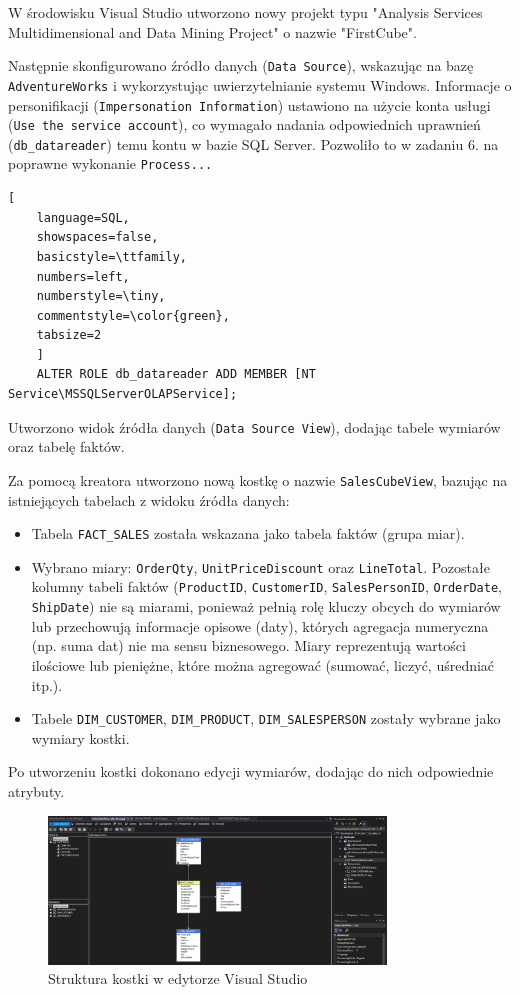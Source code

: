 \documentclass[a4paper,12pt]{article}
\begin{document}
W środowisku Visual Studio utworzono nowy projekt typu "Analysis Services Multidimensional and Data Mining Project" o nazwie "FirstCube".

Następnie skonfigurowano źródło danych (\texttt{Data Source}), wskazując na bazę \texttt{AdventureWorks} i wykorzystując uwierzytelnianie systemu Windows. Informacje o personifikacji (\texttt{Impersonation Information}) ustawiono na użycie konta usługi (\texttt{Use the service account}), co wymagało nadania odpowiednich uprawnień (\texttt{db\_datareader}) temu kontu w bazie SQL Server.
Pozwoliło to w zadaniu 6. na poprawne wykonanie \texttt{Process...}
{\small
    \begin{lstlisting}[
    language=SQL,
    showspaces=false,
    basicstyle=\ttfamily,
    numbers=left,
    numberstyle=\tiny,
    commentstyle=\color{green},
    tabsize=2
    ]
    ALTER ROLE db_datareader ADD MEMBER [NT Service\MSSQLServerOLAPService];
    \end{lstlisting}
}

Utworzono widok źródła danych (\texttt{Data Source View}), dodając tabele wymiarów oraz tabelę faktów.

Za pomocą kreatora utworzono nową kostkę o nazwie \texttt{SalesCubeView}, bazując na istniejących tabelach z widoku źródła danych:
\begin{itemize}
    \item Tabela \texttt{FACT\_SALES} została wskazana jako tabela faktów (grupa miar).
    \item Wybrano miary: \texttt{OrderQty}, \texttt{UnitPriceDiscount} oraz \texttt{LineTotal}. Pozostałe kolumny tabeli faktów (\texttt{ProductID}, \texttt{CustomerID}, \texttt{SalesPersonID}, \texttt{OrderDate}, \texttt{ShipDate}) nie są miarami, ponieważ pełnią rolę kluczy obcych do wymiarów lub przechowują informacje opisowe (daty), których agregacja numeryczna (np. suma dat) nie ma sensu biznesowego. Miary reprezentują wartości ilościowe lub pieniężne, które można agregować (sumować, liczyć, uśredniać itp.).
    \item Tabele \texttt{DIM\_CUSTOMER}, \texttt{DIM\_PRODUCT}, \texttt{DIM\_SALESPERSON} zostały wybrane jako wymiary kostki.
\end{itemize}

Po utworzeniu kostki dokonano edycji wymiarów, dodając do nich odpowiednie atrybuty.

\begin{figure}[H]
    \centering
    \includegraphics[width=0.8\textwidth]{images/5.png}
    \caption{Struktura kostki w edytorze Visual Studio}
\end{figure}
\end{document}
